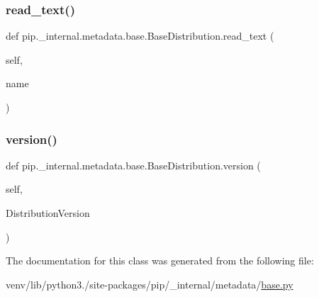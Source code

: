 \subsubsection{\texorpdfstring{read\+\_\+text()}{read\_text()}}
{\footnotesize\ttfamily def pip.\+\_\+internal.\+metadata.\+base.\+Base\+Distribution.\+read\+\_\+text (\begin{DoxyParamCaption}\item[{}]{self,  }\item[{}]{name }\end{DoxyParamCaption})}

\mbox{\label{classpip_1_1__internal_1_1metadata_1_1base_1_1BaseDistribution_a846fd2ebbbde8b3bfd7d9e4c8361c18c}} 
\subsubsection{\texorpdfstring{version()}{version()}}
{\footnotesize\ttfamily def pip.\+\_\+internal.\+metadata.\+base.\+Base\+Distribution.\+version (\begin{DoxyParamCaption}\item[{}]{self,  }\item[{}]{Distribution\+Version }\end{DoxyParamCaption})}



The documentation for this class was generated from the following file\+:\begin{DoxyCompactItemize}
\item 
venv/lib/python3./site-\/packages/pip/\+\_\+internal/metadata/\hyperlink{__internal_2metadata_2base_8py}{base.\+py}\end{DoxyCompactItemize}
